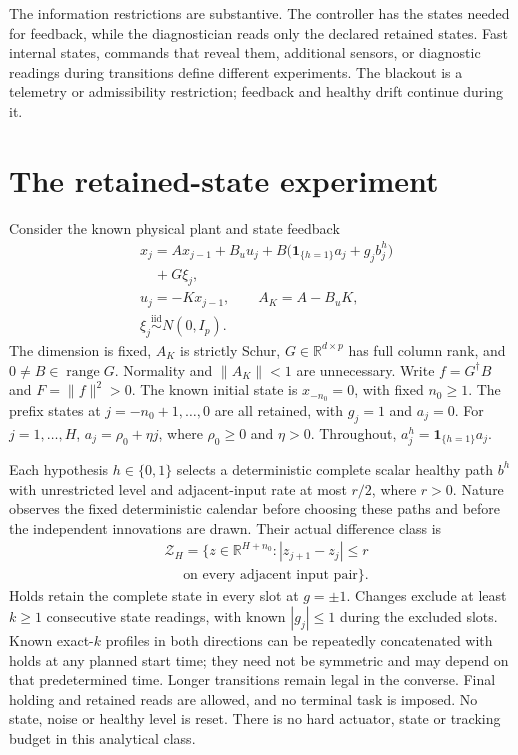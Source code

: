 \documentclass[journal]{IEEEtran}
\begin{document}
The information restrictions are substantive. The controller has the states
needed for feedback, while the diagnostician reads only the declared retained
states. Fast internal states, commands that reveal them, additional sensors,
or diagnostic readings during transitions define different experiments.
The blackout is a telemetry or admissibility restriction; feedback and
healthy drift continue during it.

\section{The retained-state experiment}\label{sf:model}
Consider the known physical plant and state feedback
\begin{equation}\label{sf:plant}
\begin{aligned}
&x_j=Ax_{j-1}+B_u u_j+B\bigl(\mathbf1_{\{h=1\}}a_j+g_jb_j^h\bigr)\\
&\quad+G\xi_j,\\
&u_j=-Kx_{j-1},\qquad A_K=A-B_uK,\\
&\xi_j\overset{\mathrm{iid}}{\sim}N(0,I_p).
\end{aligned}
\end{equation}
The dimension is fixed, $A_K$ is strictly Schur, $G\in\mathbb R^{d\times p}$
has full column rank, and $0\ne B\in\operatorname{range}G$.
Normality and $\|A_K\|<1$ are unnecessary. Write
$f=G^\dagger B$ and $F=\|f\|^2>0$. The known initial state is
$x_{-n_0}=0$, with fixed $n_0\ge1$. The prefix states at
$j=-n_0+1,\ldots,0$ are all retained, with $g_j=1$ and $a_j=0$.
For $j=1,\ldots,H$, $a_j=\rho_0+\eta j$, where $\rho_0\ge0$ and $\eta>0$.
Throughout, $a_j^h=\mathbf1_{\{h=1\}}a_j$.

Each hypothesis $h\in\{0,1\}$ selects a deterministic complete scalar healthy
path $b^h$ with unrestricted level and adjacent-input rate at most $r/2$,
where $r>0$. Nature observes the fixed deterministic calendar before choosing
these paths and before the independent innovations are drawn. Their actual
difference class is
\begin{equation}\label{sf:path}
\begin{aligned}
&\mathcal Z_H=\{z\in\mathbb R^{H+n_0}:|z_{j+1}-z_j|\le r\\
&\quad\text{ on every adjacent input pair}\}.
\end{aligned}
\end{equation}
Holds retain the complete state in every slot at $g=\pm1$. Changes exclude
at least $k\ge1$ consecutive state readings, with known $|g_j|\le1$ during
the excluded slots. Known exact-$k$ profiles in both directions can be
repeatedly concatenated with holds at any planned start time; they need not
be symmetric and may depend on that predetermined time. Longer transitions
remain legal in the converse. Final holding and retained reads are allowed,
and no terminal task is imposed. No state, noise or healthy level is reset.
There is no hard actuator, state or tracking budget in this analytical class.
\end{document}
